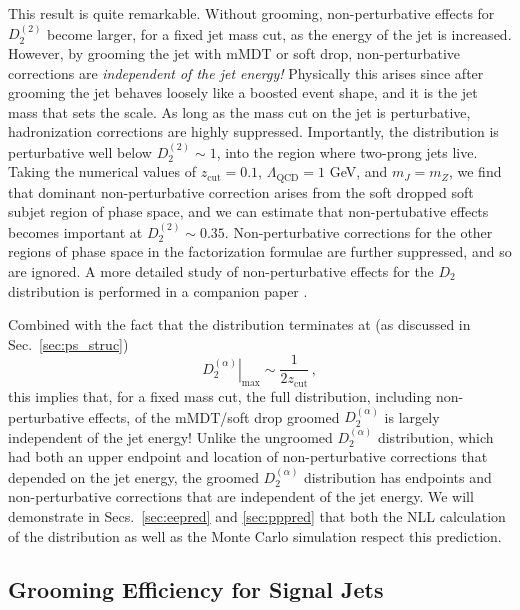 \documentclass[a4paper,11pt]{article}
\def\zcut{z_{\text{cut}}}
\newcommand{\Dobs}[2]{D_{#1}^{(#2)}}
\DeclareRobustCommand{\Sec}[1]{Sec.~\ref{#1}}
\DeclareRobustCommand{\Secs}[2]{Secs.~\ref{#1} and \ref{#2}}
\begin{document}
This result is quite remarkable.  Without grooming, non-perturbative effects for $D_2^{(2)}$ become larger, for a fixed jet mass cut, as the energy of the jet is increased.  However, by grooming the jet with mMDT or soft drop, non-perturbative corrections are {\it independent of the jet energy!} Physically this arises since after grooming the jet behaves loosely like a boosted event shape, and it is the jet mass that sets the scale.  As long as the mass cut on the jet is perturbative, hadronization corrections are highly suppressed.  
Importantly, the distribution is perturbative well below $D_2^{(2)}\sim 1$, into the region where two-prong jets live. Taking the numerical values of $\zcut=0.1$, $\Lambda_{\text{QCD}}=1$ GeV, and $m_J=m_Z$, we find  that dominant non-perturbative correction arises from the soft dropped soft subjet region of phase space, and we can estimate that non-pertubative effects becomes important at $\Dobs{2}{2}\sim 0.35$. Non-perturbative corrections for the other regions of phase space in the factorization formulae are further suppressed, and so are ignored.  A more detailed study of non-perturbative effects for the $D_2$ distribution is performed in a companion paper \cite{Larkoski:2017iuy}.

Combined with the fact that the distribution terminates at (as discussed in \Sec{sec:ps_struc})
\begin{equation}
\left.D_2^{(\alpha)}\right|_\text{max} \sim \frac{1}{2\zcut}\,,
\end{equation}
this implies that, for a fixed mass cut, the full distribution, including non-perturbative effects, of the mMDT/soft drop groomed $D_2^{(\alpha)}$ is largely independent of the jet energy!  Unlike the ungroomed $D_2^{(\alpha)}$ distribution, which had both an upper endpoint and location of non-perturbative corrections that depended on the jet energy, the groomed $D_2^{(\alpha)}$ distribution has endpoints and non-perturbative corrections that are independent of the jet energy.  We will demonstrate in \Secs{sec:eepred}{sec:pppred} that both the NLL calculation of the distribution as well as the Monte Carlo simulation respect this prediction.




\subsection{Grooming Efficiency for Signal Jets}\label{sec:eff_signal}
\end{document}
